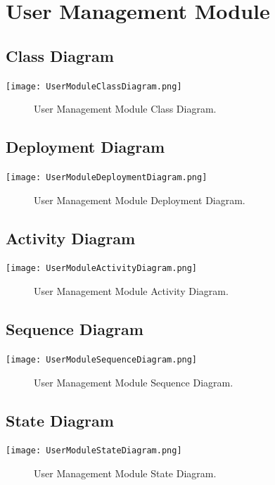 \documentclass[12pt]{article}
\begin{document}
	\section{User Management Module}
	
	\subsection{Class Diagram}
        \texttt{[image: UserModuleClassDiagram.png]}
        \begin{figure}[h]
            \caption{User Management Module Class Diagram.}
        \end{figure}
    
    \subsection{Deployment Diagram}
        \texttt{[image: UserModuleDeploymentDiagram.png]}
        \begin{figure}[h]
            \caption{User Management Module Deployment Diagram.}
        \end{figure}
        
    \subsection{Activity Diagram}
        \texttt{[image: UserModuleActivityDiagram.png]}
        \begin{figure}[h]
            \caption{User Management Module Activity Diagram.}
        \end{figure}

    \subsection{Sequence Diagram}
        \texttt{[image: UserModuleSequenceDiagram.png]}
        \begin{figure}[h]
            \caption{User Management Module Sequence Diagram.}
        \end{figure}

	
	\subsection{State Diagram}
       \texttt{[image: UserModuleStateDiagram.png]}
        \begin{figure}[h]
        	\caption{User Management Module State Diagram.}
        \end{figure}
	
\end{document}
